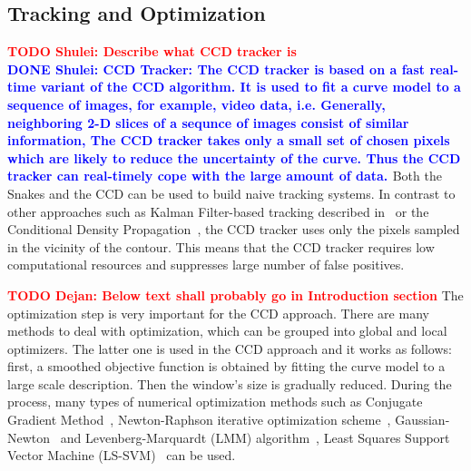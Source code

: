 \documentclass[conference]{IEEEtran}
\newcommand{\todos}[1]{\textbf{\textcolor{red}{TODO Shulei: #1}}}
\newcommand{\todod}[1]{\textbf{\textcolor{red}{TODO Dejan: #1}}}
\newcommand{\dones}[1]{\textbf{\textcolor{blue}{DONE Shulei: #1}}}
\begin{document}
\subsection{Tracking and Optimization}
\todos{Describe what CCD tracker is}\\
\dones{CCD Tracker: The CCD tracker is based on a fast real-time
  variant of the CCD algorithm. It is used to fit a curve model to a
  sequence of images, for example, video data, i.e. Generally,
  neighboring 2-D slices of a sequnce of images consist of similar
  information, The CCD tracker takes only a small set of chosen pixels
  which are likely to reduce the uncertainty of the curve. Thus the
  CCD tracker can real-timely cope with the large amount of data.
}
Both the Snakes and the CCD can be used to build naive tracking
systems. In contrast to other approaches such as Kalman Filter-based
tracking described in~\cite{brookner1998tracking} or the Conditional
Density Propagation~\cite{isard1998icondensation}, the CCD tracker
uses only the pixels sampled in the vicinity of the contour. This means that the CCD 
tracker requires low computational resources and suppresses large number
of false positives.

\todod{Below text shall probably go in Introduction section}
The optimization step is very important for the CCD approach. There are many methods to
deal with optimization, which can be grouped into global and local
optimizers. The latter one is used in the CCD approach and it works as follows: 
first, a smoothed objective function is obtained by fitting
the curve model to a large scale description. Then the window's size is
gradually reduced. During the process, many types of  numerical
optimization methods such as Conjugate Gradient Method~\cite{press2007numerical}, 
Newton-Raphson iterative optimization scheme~\cite{bishop2006pattern}, Gaussian-Newton~\cite{panin2006fully} and Levenberg-Marquardt
(LMM) algorithm~\cite{contourpanin2011}, Least Squares Support Vector
Machine (LS-SVM)~\cite{vapnik2000nature} can be used.
\end{document}
